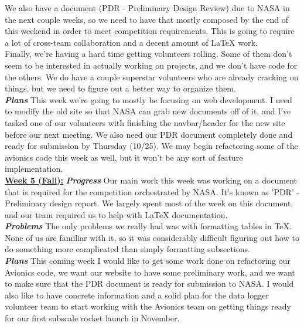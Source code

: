 \documentclass[onecolumn, draftclsnofoot, 10pt, compsoc]{IEEEtran}
\begin{document}
We also have a document (PDR - Preliminary Design Review) due to NASA in the next couple weeks, so we need to
have that mostly composed by the end of this weekend in order to meet competition requirements. This is going to
require a lot of cross-team collaboration and a decent amount of LaTeX work. \\

Finally, we're having a hard time getting volunteers rolling. Some of them don't seem to be interested in actually
working on projects, and we don't have code for the others. We do have a couple superstar volunteers who are 
already cracking on things, but we need to figure out a better way to organize them. \\

\textbf{\textit{{Plans}}}
\newline This week we're going to mostly be focusing on web development. I need to modify the old site so that NASA can
grab new documents off of it, and I've tasked one of our volunteers with finishing the navbar/header for the new
site before our next meeting. We also need our PDR document completely done and ready for submission by Thursday
(10/25). We may begin refactoring some of the avionics code this week as well, but it won't be any sort of
feature implementation. \\

\underline{\textbf{Week 5 (Fall):}}
\newline\textbf{\textit{{Progress}}}
\newline Our main work this week was working on a document that is required for the competition orchestrated by NASA. It's known as 'PDR' - Preliminary design report. We largely spent most of the week on this document, and our team required us to help with LaTeX documentation. \\

\textbf{\textit{{Problems}}}
\newline The only problems we really had was with formatting tables in TeX. None of us are familiar with it, so it was considerably difficult figuring out how to do something more complicated than simply formatting subsections. \\

\textbf{\textit{{Plans}}}
\newline This coming week I would like to get some work done on refactoring our Avionics code, we want our website to have some preliminary work, and we want to make sure that the PDR document is ready for submission to NASA. I would also like to have concrete information and a solid plan for the data logger volunteer team to start working with the Avionics team on getting things ready for our first subscale rocket launch in November. \\
\end{document}
